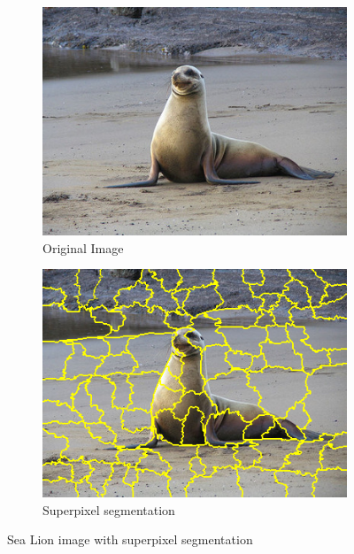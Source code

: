 \begin{figure}
    \captionsetup{justification=centering}

    \begin{subfigure}[t]{0.48\textwidth}
        \captionsetup{justification=centering}
        \centering
        \includegraphics[width=.7\linewidth]{figuras/lime/experiments/sea_lion.jpeg}
        \caption{Original Image}
    \end{subfigure}
    \hfill
    \begin{subfigure}[t]{0.48\textwidth}
        \captionsetup{justification=centering}
        \centering
        \includegraphics[width=.7\linewidth]{figuras/lime/experiments/sea_lion_lime_segmentation.png}
        \caption{Superpixel segmentation}
    \end{subfigure}

    \caption{Sea Lion image with superpixel segmentation}
\end{figure}

